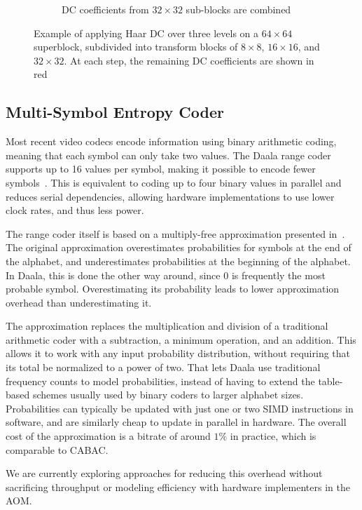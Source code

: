 \documentclass[english,conference,10pt]{IEEEtran}
\begin{document}
\begin{figure}
\begin{subfigure}[t]{0.49\columnwidth}
\caption{DC coefficients from $32\times 32$ sub-blocks are combined}
\end{subfigure}
\caption{Example of applying Haar DC over three levels on a $64\times 64$
superblock, subdivided into transform blocks of $8 \times 8$, $16 \times 16$,
and $32 \times 32$. At each step, the remaining DC coefficients
are shown in red\label{fig:haardc}}

\end{figure}

\subsection{Multi-Symbol Entropy Coder}

Most recent video codecs encode information using binary arithmetic
coding, meaning that each symbol can only take two values. The Daala
range coder supports up to 16 values per symbol, making it possible
to encode fewer symbols~\cite{derfTools}. This is equivalent to
coding up to four binary values in parallel and reduces serial dependencies,
allowing hardware implementations to use lower clock rates, and thus less
power.

The range coder itself is based on a multiply-free approximation presented
in~\cite{stuiver1998piecewise}. The original approximation overestimates
probabilities for symbols at the end of the alphabet, and underestimates
probabilities at the beginning of the alphabet. In Daala, this is done the
other way around, since $0$ is frequently the most probable symbol.
Overestimating its probability leads to lower approximation overhead than
underestimating it.

The approximation replaces the multiplication and division of a traditional
arithmetic coder with a subtraction, a minimum operation, and an addition. This
allows it to work with any input probability distribution, without requiring
that its total be normalized to a power of two. That lets Daala use traditional
frequency counts to model probabilities, instead of having to extend the
table-based schemes usually used by binary coders to larger alphabet sizes.
Probabilities can typically be updated with just one or two SIMD instructions
in software, and are similarly cheap to update in parallel in hardware. The
overall cost of the approximation is a bitrate of around $1\%$ in practice,
which is comparable to CABAC.

We are currently exploring approaches for reducing this overhead without
sacrificing throughput or modeling efficiency with hardware implementers in the
AOM.
\end{document}
